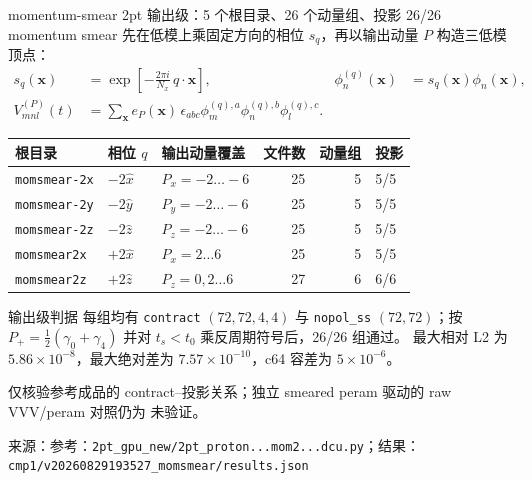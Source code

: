 \documentclass[UTF8,aspectratio=169,11pt]{ctexbeamer}
\newcommand{\source}[1]{\vspace{0.05em}\par{\raggedright\scriptsize\color{muted}来源：#1\par}}
\newcommand{\codepath}[1]{\nolinkurl{#1}}
\newcommand{\unverified}{\textcolor{warning}{未验证}}
\begin{document}
\begin{frame}[t]{momentum-smear 2pt 输出级：5 个根目录、26 个动量组、投影 26/26}
  \scriptsize
  momentum smear 先在低模上乘固定方向的相位 $s_q$，再以输出动量 $P$ 构造三低模顶点：
  \begin{align*}
    s_q(\boldsymbol x)&=\exp\!\left[-\frac{2\pi i}{N_x}\,q\!\cdot\!\boldsymbol x\right],
    &\phi_n^{(q)}(\boldsymbol x)&=s_q(\boldsymbol x)\phi_n(\boldsymbol x),\\
    V^{(P)}_{mnl}(t)&=\sum_{\boldsymbol x}e_P(\boldsymbol x)\,
      \epsilon_{abc}\phi_m^{(q),a}\phi_n^{(q),b}\phi_l^{(q),c}.
  \end{align*}
  \setlength{\tabcolsep}{3pt}
  \renewcommand{\arraystretch}{1.02}
  \begin{tabular}{@{}l l l r r l@{}}
    \toprule
    根目录 & 相位 $q$ & 输出动量覆盖 & 文件数 & 动量组 & 投影\\
    \midrule
    \codepath{momsmear-2x} & $-2\hat x$ & $P_x=-2\ldots-6$ & 25 & 5 & 5/5\\
    \codepath{momsmear-2y} & $-2\hat y$ & $P_y=-2\ldots-6$ & 25 & 5 & 5/5\\
    \codepath{momsmear-2z} & $-2\hat z$ & $P_z=-2\ldots-6$ & 25 & 5 & 5/5\\
    \codepath{momsmear2x} & $+2\hat x$ & $P_x=2\ldots6$ & 25 & 5 & 5/5\\
    \codepath{momsmear2z} & $+2\hat z$ & $P_z=0,2\ldots6$ & 27 & 6 & 6/6\\
    \bottomrule
  \end{tabular}
  \vspace{0.10em}
  \begin{block}{输出级判据}
    每组均有 \codepath{contract} $(72,72,4,4)$ 与 \codepath{nopol\_ss} $(72,72)$；按
    $P_+=\frac12(\gamma_0+\gamma_4)$ 并对 $t_s<t_0$ 乘反周期符号后，26/26 组通过。
    最大相对 L2 为 $5.86\times10^{-8}$，最大绝对差为 $7.57\times10^{-10}$，c64 容差为
    $5\times10^{-6}$。
  \end{block}
  \colorbox{warnbg}{\parbox{0.94\linewidth}{\centering
    仅核验参考成品的 contract--投影关系；独立 smeared peram 驱动的 raw VVV/peram 对照仍为 \unverified。}}
  \source{参考：\codepath{2pt_gpu_new/2pt_proton...mom2...dcu.py}；结果：\codepath{cmp1/v20260829193527_momsmear/results.json}}
\end{frame}
\end{document}
